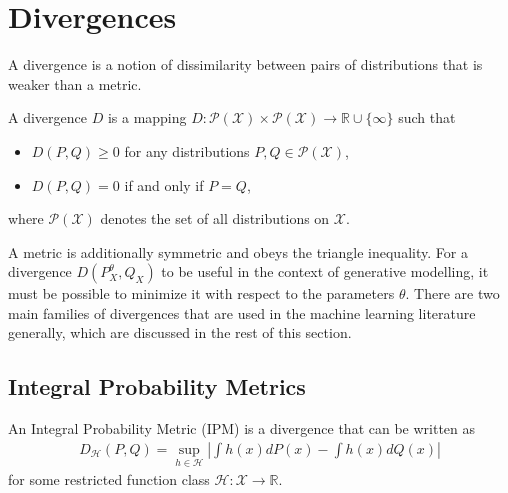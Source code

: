 \section{Divergences}\label{subsec:gen-model-divergence}

A divergence is a notion of dissimilarity between pairs of distributions that is weaker than a metric.

\medskip

\begin{definition}
A divergence $D$ is a mapping $D: \mathcal{P}(\mathcal{X}) \times \mathcal{P}(\mathcal{X}) \to \mathbb{R} \cup \{\infty\}$ such that

\begin{itemize}
\item $D(P, Q)  \geq 0$ for any distributions $P, Q \in \mathcal{P}(\mathcal{X})$,
\item $D(P, Q) = 0$ if and only if $P = Q$,
\end{itemize}

where $\mathcal{P}(\mathcal{X})$ denotes the set of all distributions on $\mathcal{X}$.
\end{definition}


A metric is additionally symmetric and obeys the triangle inequality.
For a divergence $D(P^\theta_X, Q_X)$ to be useful in the context of generative modelling, it must be possible to minimize it with respect to the parameters $\theta$. 
There are two main families of divergences that are used in the machine learning literature generally, which are discussed in the rest of this section.

\subsection{Integral Probability Metrics}\label{subsec:intro-ipm}

\begin{definition}
An Integral Probability Metric (IPM) is a divergence that can be written as
%
\begin{align*}
D_{\mathcal{H}}(P, Q) = \sup_{h\in\mathcal{H}} \left| \int h(x) dP(x) - \int h(x) dQ(x) \right|
\end{align*}
%
for some restricted function class $\mathcal{H}: \mathcal{X} \to \mathbb{R}$. 
\end{definition}


